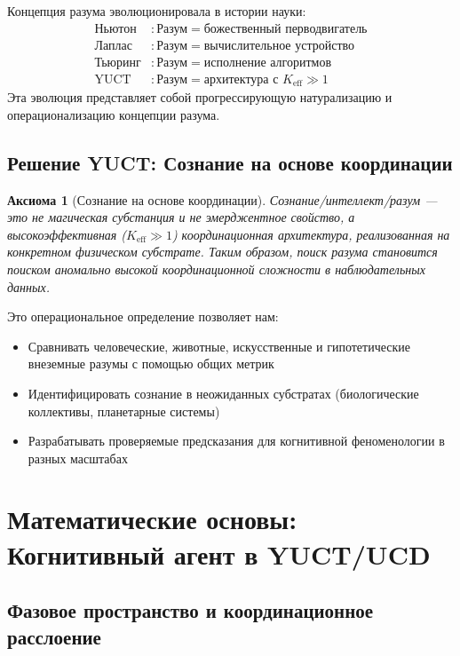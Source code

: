\documentclass[12pt,a4paper]{article}
\newtheorem{axiom}{Аксиома}
\newcommand{\eff}{\mathrm{eff}}
\newcommand{\Ke}{K_{\eff}}
\begin{document}
	Концепция разума эволюционировала в истории науки:
	\[
	\begin{aligned}
		\text{Ньютон} &: \text{Разум} = \text{божественный перводвигатель} \\
		\text{Лаплас} &: \text{Разум} = \text{вычислительное устройство} \\
		\text{Тьюринг} &: \text{Разум} = \text{исполнение алгоритмов} \\
		\text{YUCT} &: \text{Разум} = \text{архитектура с } \Ke \gg 1
	\end{aligned}
	\]
	Эта эволюция представляет собой прогрессирующую натурализацию и операционализацию концепции разума.
	
	\subsection{Решение YUCT: Сознание на основе координации}
	
	\begin{axiom}[Сознание на основе координации]
		Сознание/интеллект/разум — это не магическая субстанция и не эмерджентное свойство, а высокоэффективная (\(\Ke \gg 1\)) координационная архитектура, реализованная на конкретном физическом субстрате. Таким образом, поиск разума становится поиском аномально высокой координационной сложности в наблюдательных данных.
	\end{axiom}
	
	Это операциональное определение позволяет нам:
	\begin{itemize}
		\item Сравнивать человеческие, животные, искусственные и гипотетические внеземные разумы с помощью общих метрик
		\item Идентифицировать сознание в неожиданных субстратах (биологические коллективы, планетарные системы)
		\item Разрабатывать проверяемые предсказания для когнитивной феноменологии в разных масштабах
	\end{itemize}
	
	\section{Математические основы: Когнитивный агент в YUCT/UCD}
	
	\subsection{Фазовое пространство и координационное расслоение}
	
\end{document}
